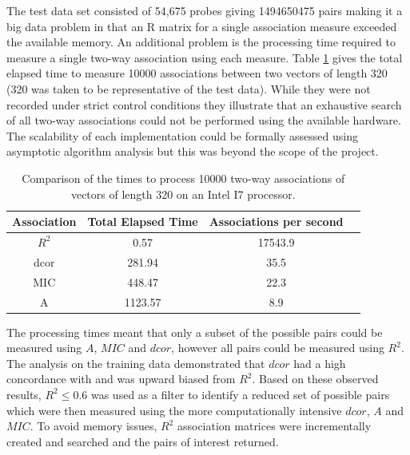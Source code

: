 \documentclass[a4paper, 12pt]{report}
\begin{document}
The test data set consisted of 54,675 probes giving 1494650475 pairs making it a big data problem in that an R matrix for a single association measure exceeded the available memory. %
An additional problem is the processing time required to measure a single two-way association using each measure. Table \ref{T:times} gives the total elapsed time to measure 10000 associations between two vectors of length 320 (320 was taken to be representative of the test data). While they were not recorded under strict control conditions they illustrate that an exhaustive search of all two-way associations could not be performed using the available hardware. The scalability of each implementation could be formally assessed using asymptotic algorithm analysis \cite{knuth} but this was beyond the scope of the project.

\begin{table}[H]
\begin{centering}
\begin{tabular}{cccc}
  \hline
Association & Total Elapsed Time & Associations per second \\ 
  \hline
$R^2$ & 0.57  & 17543.9 \\ 
dcor & 281.94  & 35.5   \\ 
MIC & 448.47  & 22.3   \\ 
A & 1123.57  & 8.9   \\ 
   \hline
\end{tabular}
\caption{Comparison of the times to process 10000 two-way associations of vectors of length 320 on an Intel I7 processor.} 
\label{T:times}
\end{centering}
\end{table}

The processing times meant that only a subset of the possible pairs could be measured using $A$, $MIC$ and $dcor$, however all pairs could be measured using $R^2$. The analysis on the training data demonstrated that $dcor$ had a high concordance with and was upward biased from $R^2$. %
Based on these observed results, $R^2 \le 0.6$ was used as a filter to identify a reduced set of possible pairs which were then measured using the more computationally intensive $dcor$, $A$ and $MIC$. To avoid memory issues, $R^2$ association matrices were incrementally created and searched and the pairs of interest returned.
\end{document}
